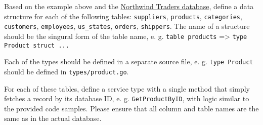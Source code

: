\documentclass[a4paper,12pt]{article}
\begin{document}
Based on the example above and the \href{https://github.com/pthom/northwind_psql/blob/master/ER.png}{Northwind Traders database}, define a data structure for each of the following tables: \texttt{suppliers}, \texttt{products}, \texttt{categories}, \texttt{customers}, \texttt{employees}, \texttt{us\_states}, \texttt{orders}, \texttt{shippers}. The name of a structure should be the singural form of the table name, e. g. \texttt{table products} => \texttt{type Product struct ...}

Each of the types should be defined in a separate source file, e. g. \texttt{type Product} should be defined in \texttt{types/product.go}.

For each of these tables, define a service type with a single method that simply fetches a record by its database ID, e. g. \texttt{GetProductByID}, with logic similar to the provided code samples. Please ensure that all column and table names are the same as in the actual database.
\end{document}
